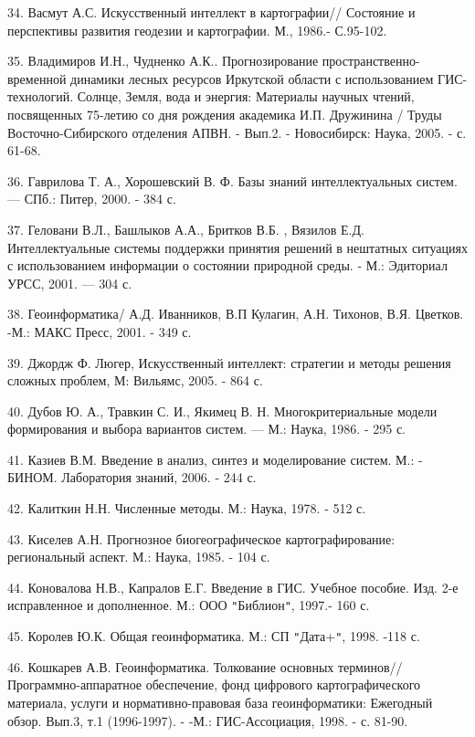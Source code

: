 \documentclass{article}
\begin{document}
34. Васмут А.С. Искусственный интеллект в картографии// 
Состояние и перспективы развития геодезии 
и картографии. М., 1986.- С.95-102.

35. Владимиров И.Н., Чудненко А.К.. Прогнозирование 
пространственно-временной динамики лесных 
ресурсов Иркутской области с использованием 
ГИС-технологий. Солнце, Земля, вода и энергия: 
Материалы научных чтений, посвященных 75-летию 
со дня рождения академика И.П. Дружинина / Труды 
Восточно-Сибирского отделения АПВН. - Вып.2. 
- Новосибирск: Наука, 2005. - с. 61-68.

36. Гаврилова Т. А., Хорошевский В. Ф. Базы знаний 
интеллектуальных систем. --- СПб.: Питер, 2000. - 
384 с.

37. Геловани В.Л., Башлыков А.А., Бритков В.Б. , Вязилов 
Е.Д. Интеллектуальные системы поддержки принятия 
решений в нештатных ситуациях с использованием 
информации о состоянии природной среды. - М.: 
Эдиториал УРСС, 2001. --- 304 с.

38. Геоинформатика/ А.Д. Иванников, В.П Кулагин, 
А.Н. Тихонов, В.Я. Цветков. -М.: МАКС Пресс, 2001. 
- 349 с.

39. Джордж Ф. Люгер,  Искусственный интеллект: 
стратегии и методы решения сложных проблем, 
М: Вильямс, 2005. - 864 с.

40. Дубов Ю. А., Травкин С. И., Якимец В. Н. Многокритериальные 
модели формирования и выбора вариантов систем. 
--- М.: Наука, 1986. - 295 с.

41. Казиев В.М. Введение в анализ, синтез и моделирование 
систем.  М.: - БИНОМ. Лаборатория знаний, 2006. - 
244 с.\label{OLEHLINK26}\label{OLEHLINK27}

42. Калиткин Н.Н. Численные методы. М.: Наука, 1978. 
- 512 с.

43. Киселев А.Н. Прогнозное биогеографическое 
картографирование: региональный аспект. М.: 
Наука, 1985. - 104 с.

44. Коновалова Н.В., Капралов Е.Г. Введение в ГИС. 
Учебное пособие. Изд. 2-е исправленное и дополненное. 
М.: ООО \texttt{"}Библион\texttt{"}, 1997.- 160 с.

45. Королев Ю.К. Общая геоинформатика. М.: СП \texttt{"}Дата+\texttt{"}, 
1998. -118 с.

46. Кошкарев А.В. Геоинформатика. Толкование 
основных терминов//Программно-аппаратное обеспечение, 
фонд цифрового картографического материала, 
услуги и нормативно-правовая база геоинформатики: 
Ежегодный обзор. Вып.3, т.1 (1996-1997). - -М.: ГИС-Ассоциация, 
1998. - с. 81-90.
\end{document}
